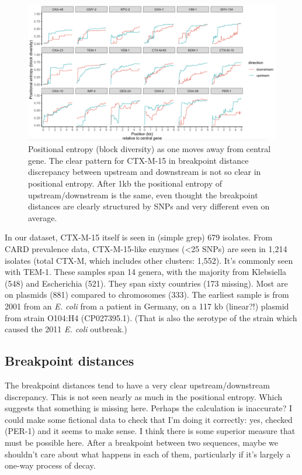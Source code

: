 \documentclass[aps,rmp,preprint,superscriptaddress,10pt,twocolumn]{revtex4-1}
\begin{document}
\begin{figure}
    \centering
\includegraphics[width=\linewidth]{figs/positional-entropy.png}
    \caption{Positional entropy (block diversity) as one moves away from central gene. The clear pattern for CTX-M-15 in breakpoint distance discrepancy between upstream and downstream is not so clear in positional entropy. After 1kb the positional entropy of upstream/downstream is the same, even thought the breakpoint distances are clearly structured by SNPs and very different even on average.}
    \label{fig:positional entropy}
\end{figure}

In our dataset, CTX-M-15 itself is seen in (simple grep) 679 isolates. From CARD prevalence data, CTX-M-15-like enzymes (<25 SNPs) are seen in 1,214 isolates (total CTX-M, which includes other clusters: 1,552). It's commonly seen with TEM-1. These samples span 14 genera, with the majority from Klebsiella (548) and Escherichia (521). They span sixty countries (173 missing). Most are on plasmids (881) compared to chromosomes (333). The earliest sample is from 2001 from an \textit{E. coli} from a patient in Germany, on a 117 kb (linear?!) plasmid from strain O104:H4 (CP027395.1). (That is also the serotype of the strain which caused the 2011 \textit{E. coli} outbreak.)

\subsection{Breakpoint distances}

The breakpoint distances tend to have a very clear upstream/downstream discrepancy. This is not seen nearly as much in the positional entropy. Which suggests that something is missing here. Perhaps the calculation is inaccurate? I could make some fictional data to check that I'm doing it correctly: yes, checked (PER-1) and it seems to make sense. I think there is some superior measure that must be possible here. After a breakpoint between two sequences, maybe we shouldn't care about what happens in each of them, particularly if it's largely a one-way process of decay. 
\end{document}
